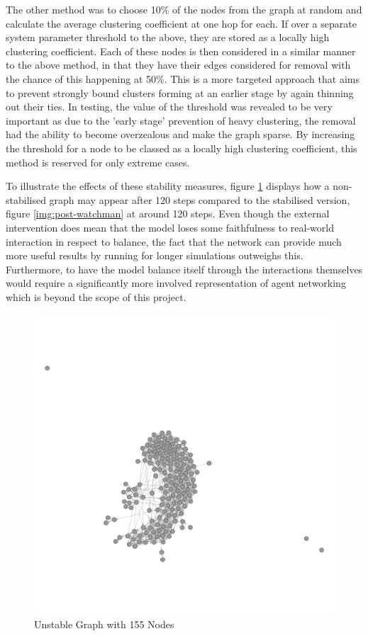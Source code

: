 \documentclass[]{report}
\begin{document}
The other method was to choose 10\% of the nodes from the graph at random and calculate the average clustering coefficient at one hop for each. If over a separate system parameter threshold to the above, they are stored as a locally high clustering coefficient. Each of these nodes is then considered in a similar manner to the above method, in that they have their edges considered for removal with the chance of this happening at 50\%. This is a more targeted approach that aims to prevent strongly bound clusters forming at an earlier stage by again thinning out their ties. In testing, the value of the threshold was revealed to be very important as due to the 'early stage' prevention of heavy clustering, the removal had the ability to become overzealous and make the graph sparse. By increasing the threshold for a node to be classed as a locally high clustering coefficient, this method is reserved for only extreme cases.

To illustrate the effects of these stability measures, figure \ref{img:pre-watchman} displays how a non-stabilised graph may appear after 120 steps compared to the stabilised version, figure \ref{img:post-watchman} at around 120 steps. Even though the external intervention does mean that the model loses some faithfulness to real-world interaction in respect to balance, the fact that the network can provide much more useful results by running for longer simulations outweighs this. Furthermore, to have the model balance itself through the interactions themselves would require a significantly more involved representation of agent networking which is beyond the scope of this project.

\begin{figure}
\label{img:pre-watchman}
\begin{center}
\includegraphics[scale=0.25]{pre-balance.png}
\end{center}
\caption{Unstable Graph with 155 Nodes}
\end{figure}
\end{document}

